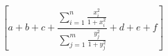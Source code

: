 \begin{equation*}
 \left[a+b+c+
 \frac{\displaystyle\sum_{i=1}^n
              \frac{x_i^2}{1+x_i^2}}
      {\displaystyle\sum_{j=1}^m
              \frac{y_j^2}{1+y_j^2}}
 +d+e+f\right]
\end{equation*}
